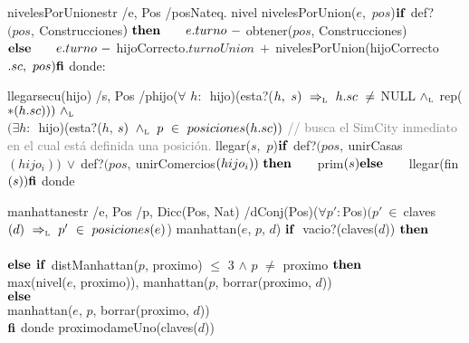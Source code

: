 \vspace{4mm}
\tadOperacion
{nivelesPorUnion}{estr /e, Pos /pos}{Nat}{eq. nivel}            
\tadAxioma
{nivelesPorUnion($e$,\ $pos$)}{$
    \LIF\ $def?$(pos,\ $Construcciones$)\ \LTHEN\ \\
    \tab e.turno\ -\ $obtener($pos$, Construcciones)$\\
    \LELSE\ \\
    \tab e.turno\ -\ $hijoCorrecto$.turnoUnion\ +\ $nivelesPorUnion(hijoCorrecto$.sc,\ pos) \\
    \textrm{\textbf{fi}} 
$}
donde:
    
\vspace{4mm}
\tadOperacion
{llegar}{secu(hijo) /s, Pos /p}{hijo}{($\forall$ $h:$\ hijo)(esta?($h,\ s)\ \Rightarrow_{\mathrm{\scriptscriptstyle{L}}}\ h.sc\ \neq\ $NULL$\ \land_{\mathrm{\scriptscriptstyle{L}}}\ $rep($*(h.sc)))\ \land_{\mathrm{\scriptscriptstyle{L}}}\ $\\$ (\exists h:$\ hijo)(esta?($h$, $s)\ \yluego\ p\ \in\ posiciones(h.sc))$} 
\textcolor{gray}{// busca el SimCity inmediato en el cual está definida una posición.}
\tadAxioma
{llegar($s$,\ $p$)}{$
    \LIF\ $def?$(pos,\ $unirCasas$(hijo_i))\ \vee\ $def?$(pos,\ $unirComercios$(hijo_i))\ \textrm{\textbf{then}}\ \\ 
    \hspace*{7mm} $prim$(s) \\ 
    \textrm{\textbf{else}}\ \\
    \hspace*{7mm} $llegar(fin$(s)) \\ 
    \textrm{\textbf{fi}}
$}
donde

\newpage

\vspace{4mm}
\tadOperacion
{manhattan}{estr /e, Pos /p, Dicc(Pos, Nat) /d}{Conj(Pos)}{($\forall p': $Pos$)(p'\ \in\ $claves$(d)\ \impluego\ p'\ \in\ posiciones(e)$)}            
\tadAxioma
{manhattan($e$, $p$, $d$)}{
    $\textrm{\textbf{if}}$\ vacio?(claves($d$)) $\textrm{\textbf{then}}$ \\
         \\
    $\textrm{\textbf{else}}$ $\textrm{\textbf{if}}$ distManhattan($p$, proximo) $\leq$ 3 $\land$ $p$ $\neq$ proximo $\textrm{\textbf{then}}$ \\
        \tab max(nivel($e$, proximo)), manhattan($p$, borrar(proximo, $d$)) \\
    $\textrm{\textbf{else}}$ \\
        \tab manhattan($e$, $p$, borrar(proximo, $d$)) \\
    $\textrm{\textbf{fi}}$  
}
donde 
\tadAxioma
{\tab proximo}{dameUno(claves($d$))}  

